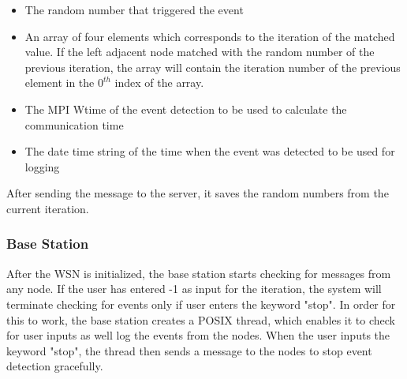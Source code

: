 \documentclass[conference]{IEEEtran}
\begin{document}
		\begin{itemize}
		\item The random number that triggered the event
		\item An array of four elements which corresponds to the iteration of the matched value. If the left adjacent node matched with the random number of the previous iteration, the array will contain the iteration number of the previous element in the $0^{th}$ index of the array. 
		\item The MPI Wtime of the event detection to be used to calculate the communication time
		\item The date time string of the time when the event was detected to be used for logging
	\end{itemize}
	
	After sending the message to the server, it saves the random numbers from the current iteration. 
	

	\subsubsection{Base Station}
	After the WSN is initialized, the base station starts checking for messages from any node. If the user has entered -1 as input for the iteration, the system will terminate checking for events only if user enters the keyword "stop". In order for this to work, the base station creates a POSIX thread, which enables it to check for user inputs as well log the events from the nodes. When the user inputs the keyword "stop", the thread then sends a message to the nodes to stop event detection gracefully. 
	
	
		
		
	
\end{document}
